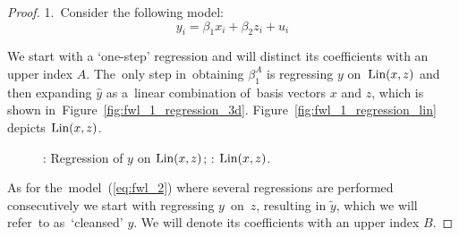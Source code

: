 \begin{proof}
1.~Consider the following model:
\begin{equation} \label{eq:fwl_proof}
y_i = \beta_1 x_i + \beta_2 z_i + u_i
\end{equation}

We start with a `one-step' regression  and will distinct its coefficients with
an upper index $A$.
The~only step in~obtaining $\beta_1^{A}$ is regressing $y$ on~$\operatorname{Lin}(x,z)$ and
then expanding $\hat y$ as a~linear combination of~basis vectors $x$ and $z$,
which is shown in~Figure~\ref{fig:fwl_1_regression_3d}. Figure~\ref{fig:fwl_1_regression_lin}
depicts $\operatorname{Lin}(x, z)$.

\begin{figure}[ht!]
\begin{center}
\hspace{4ex}
\caption{: Regression of $y$ on $\operatorname{Lin}(x,z)$;
: $\operatorname{Lin}(x, z)$.}
\end{center}
\end{figure}

As for the~model~(\ref{eq:fwl_2}) where several regressions are performed consecutively
we start with regressing $y$~on~$z$, resulting in $\tilde{y}$,
which we will refer~to as~`cleansed' $y$.
We will denote its coefficients with an upper index $B$.


\end{proof}
